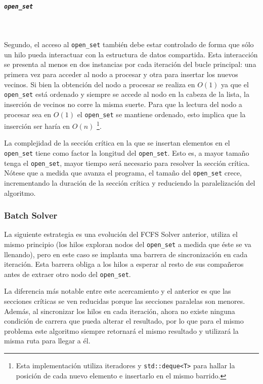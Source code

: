 \subparagraph{\lstinline{open_set}}~

Segundo, el acceso al \lstinline{open_set} también 
debe estar controlado de forma que sólo un hilo
pueda interactuar con la estructura de datos compartida.
Esta interacción se presenta al menos en dos instancias por
cada iteración del bucle principal:
una primera vez para acceder al nodo a procesar
y otra para insertar los nuevos vecinos.
Si bien la obtención del nodo a procesar se realiza en $O(1)$
ya que el \lstinline{open_set} está ordenado y
siempre se accede al nodo en la cabeza de la lista,
la inserción de vecinos no corre la misma suerte.
Para que la lectura del nodo a procesar sea en $O(1)$
el \lstinline{open_set} se mantiene ordenado,
esto implica que la inserción ser haría en $O(n)$
\footnote{Esta implementación utiliza iteradores y
\lstinline{std::deque<T>} para hallar la posición de cada
nuevo elemento e insertarlo en el mismo barrido.}.

\begin{notebox}
    La complejidad de la sección crítica en la que se insertan
    elementos en el \lstinline{open_set}
    tiene como factor la longitud del \lstinline{open_set}. 
    Esto es, a mayor tamaño tenga el \lstinline{open_set},
    mayor tiempo será necesario para resolver la sección crítica.\\

    Nótese que a medida que avanza el programa,
    el tamaño del \lstinline{open_set} crece,
    incrementando la duración de la sección crítica y
    reduciendo la paralelización del algoritmo. 
\end{notebox}

\subsubsection{Batch Solver}

La siguiente estrategia es una evolución del FCFS Solver anterior,
utiliza el mismo principio (los hilos exploran nodos del \lstinline{open_set}
a medida que éste se va llenando),
pero en este caso se implanta una barrera de sincronización en cada iteración.
Esta barrera obliga a los hilos a esperar al resto de sus compañeros
antes de extraer otro nodo del \lstinline{open_set}.

La diferencia más notable entre este acercamiento y el anterior es que
las secciones críticas se ven reducidas porque las secciones paralelas
son menores.
Además, al sincronizar los hilos en cada iteración, ahora no existe ninguna
condición de carrera que pueda alterar el resultado, por lo que
para el mismo problema este algoritmo siempre retornará el mismo resultado
y utilizará la misma ruta para llegar a él.

